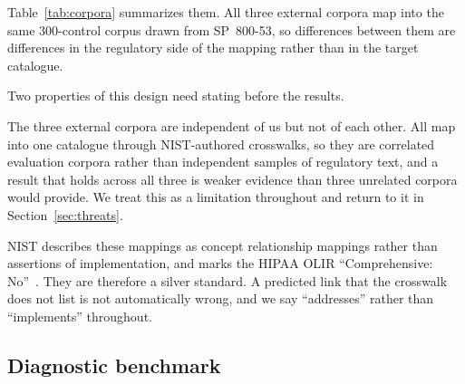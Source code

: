 \documentclass[a4paper,fleqn]{cas-sc}
\begin{document}
Table~\ref{tab:corpora} summarizes them. All three external corpora map into the same 300-control corpus drawn from SP~800-53, so differences between them are differences in the regulatory side of the mapping rather than in the target catalogue.

\begin{table}[htbp]
\caption{The four evaluation corpora. Recall@20 is the share of requirements for which the dual-encoder places a gold control in its top 20, and bounds any method that reranks that shortlist.}
\label{tab:corpora}
\centering
\setlength{\tabcolsep}{3pt}
\small
{}
\end{table}

Two properties of this design need stating before the results.

The three external corpora are independent of us but not of each other. All map into one catalogue through NIST-authored crosswalks, so they are correlated evaluation corpora rather than independent samples of regulatory text, and a result that holds across all three is weaker evidence than three unrelated corpora would provide. We treat this as a limitation throughout and return to it in Section~\ref{sec:threats}.

NIST describes these mappings as concept relationship mappings rather than assertions of implementation, and marks the HIPAA OLIR ``Comprehensive: No''~\citep{NISTIR8477}. They are therefore a silver standard. A predicted link that the crosswalk does not list is not automatically wrong, and we say ``addresses'' rather than ``implements'' throughout.

\subsection{Diagnostic benchmark}
\label{sec:dataset-synth}
\end{document}
